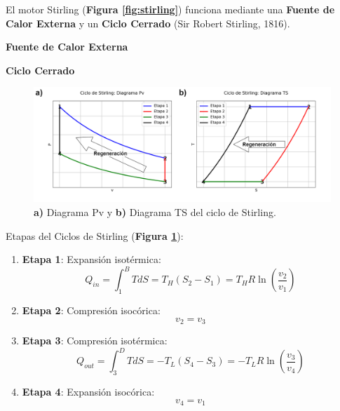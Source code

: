             El motor Stirling (\textbf{Figura \ref{fig:stirling}}) funciona mediante una \textbf{Fuente de Calor Externa} y un \textbf{Ciclo Cerrado} (Sir Robert Stirling, 1816).
            \newline
            
            \textbf{Fuente de Calor Externa}
                
            \begin{quote}
                \textit{}
            \end{quote}
                
            \textbf{Ciclo Cerrado}
            
            \begin{quote}
                \textit{}
            \end{quote}
            
            
            \begin{figure}
             \includegraphics[width=\textwidth]{img/ciclos/ciclo_stirling.png}
                \caption[Ciclo de Stirling]{\textbf{a)} Diagrama Pv y \textbf{b)} Diagrama TS del ciclo de Stirling.}
                \label{fig:ciclo_stirling}
            \end{figure}
            
            Etapas del Ciclos de Stirling (\textbf{Figura \ref{fig:ciclo_stirling}}):
            
            \begin{enumerate}
                \item \textbf{Etapa 1}: Expansión isotérmica:
                \[Q_{in}=\int_{1}^{B}TdS = T_{H}(S_{2}-S_{1})=T_{H}R\ln(\frac{v_{2}}{v_{1}})\]
                \item \textbf{Etapa 2}: Compresión isocórica:
                \[v_{2}=v_{3}\]
                \item \textbf{Etapa 3}: Compresión isotérmica:
                \[Q_{out}=\int_{3}^{D}TdS = -T_{L}(S_{4}-S_{3})=-T_{L}R\ln(\frac{v_{3}}{v_{4}})\]
                \item \textbf{Etapa 4}: Expansión isocórica:
                \[v_{4}=v_{1}\]
            \end{enumerate}
            
